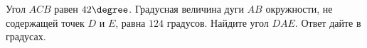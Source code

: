 \begin{ex}
	\begin{condition}
	Угол \( ACB \)  равен \( 42 \degree \). Градусная величина дуги \( AB \)  окружности, не содержащей точек \( D \)  и \( E \), равна \( 124 \) градусов. Найдите угол \( DAE \). Ответ дайте в градусах.	
	\end{condition}
\end{ex}